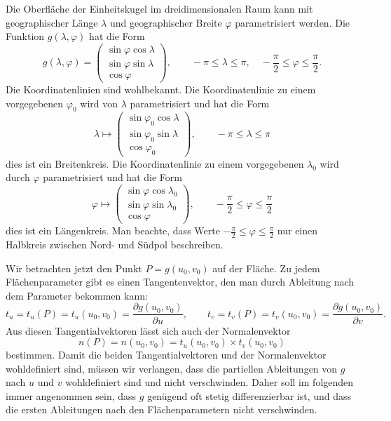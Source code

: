 \begin{beispiel}
Die Oberfläche der Einheitskugel im dreidimensionalen Raum kann mit
geographischer Länge $\lambda$ und geographischer Breite $\varphi$
parametrisiert werden.
Die Funktion $g(\lambda,\varphi)$ hat die Form
\begin{equation}
g(\lambda,\varphi)
=
\begin{pmatrix}
\sin\varphi\cos\lambda\\
\sin\varphi\sin\lambda\\
\cos\varphi
\end{pmatrix},\qquad
-\pi \le \lambda \le \pi,\quad
-\frac{\pi}2 \le \varphi \le \frac{\pi}2
.
\end{equation}
Die Koordinatenlinien sind wohlbekannt. 
Die Koordinatenlinie zu einem vorgegebenen $\varphi_0$ wird von
$\lambda$ parametrisiert und hat die Form
\[
\lambda
\mapsto
\begin{pmatrix}
\sin\varphi_0\cos\lambda\\
\sin\varphi_0\sin\lambda\\
\cos\varphi_0
\end{pmatrix},\qquad -\pi\le\lambda\le\pi
\]
dies ist ein Breitenkreis.
Die Koordinatenlinie zu einem vorgegebenen $\lambda_0$ wird durch
$\varphi$ parametrisiert und hat die Form
\[
\varphi
\mapsto
\begin{pmatrix}
\sin\varphi\cos\lambda_0\\
\sin\varphi\sin\lambda_0\\
\cos\varphi
\end{pmatrix},\qquad -\frac{\pi}2 \le \varphi\le \frac{\pi}2
\]
dies ist ein Längenkreis.
Man beachte, dass Werte $-\frac{\pi}2\le \varphi \le \frac{\pi}2$ nur einen
Halbkreis zwischen Nord- und Südpol beschreiben.
\end{beispiel}

Wir betrachten jetzt den Punkt $P=g(u_0,v_0)$ auf der Fläche.
Zu jedem Flächenparameter gibt es einen Tangentenvektor, den man durch
Ableitung nach dem Parameter bekommen kann:
\begin{equation}
t_u
=
t_u(P)
=
t_u(u_0,v_0)
=
\frac{\partial g(u_0,v_0)}{\partial u},
\qquad
t_v
=
t_v(P)
=
t_v(u_0,v_0)
=
\frac{\partial g(u_0,v_0)}{\partial v}.
\end{equation}
Aus diesen Tangentialvektoren lässt sich auch der Normalenvektor
\begin{equation}
n(P) = n(u_0,v_0) = t_u(u_0,v_0) \times t_v(u_0,v_0)
\end{equation}
bestimmen.
Damit die beiden Tangentialvektoren und der Normalenvektor wohldefiniert sind,
müssen wir verlangen, dass die partiellen Ableitungen von $g$ nach $u$ und $v$
wohldefiniert sind und nicht verschwinden.
Daher soll im folgenden immer angenommen sein, dass $g$ genügend oft stetig
differenzierbar ist, und dass die ersten Ableitungen nach den Flächenparametern
nicht verschwinden.

